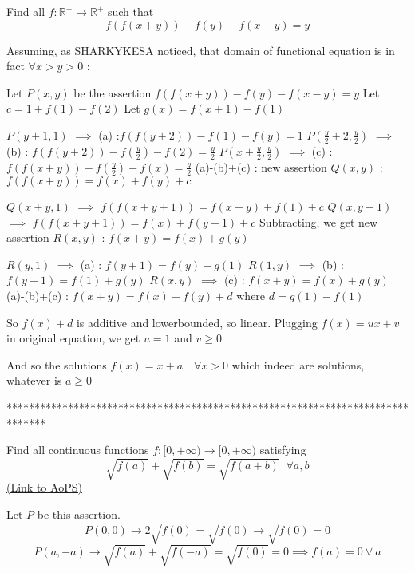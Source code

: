 \begin{solution}
	\begin{tcolorbox}Find all $f: \mathbb{R}^+ \to \mathbb{R}^+$ such that
\[f(f(x+y)) - f(y) - f(x-y) = y\]\end{tcolorbox}
Assuming, as SHARKYKESA noticed, that domain of functional equation is in fact $\forall x>y>0$ :

Let $P(x,y)$ be the assertion $f(f(x+y))-f(y)-f(x-y)=y$
Let $c=1+f(1)-f(2)$
Let $g(x)=f(x+1)-f(1)$

$P(y+1,1)$ $\implies$ (a) :$f(f(y+2))-f(1)-f(y)=1$
$P(\frac y2+2,\frac y2)$ $\implies$ (b) : $f(f(y+2))-f(\frac y2)-f(2)=\frac y2$
$P(x+\frac y2,\frac y2)$ $\implies$ (c) :$f(f(x+y))-f(\frac y2)-f(x)=\frac y2$
(a)-(b)+(c) : new assertion $Q(x,y)$ : $f(f(x+y))=f(x)+f(y)+c$

$Q(x+y,1)$ $\implies$ $f(f(x+y+1))=f(x+y)+f(1)+c$
$Q(x,y+1)$ $\implies$ $f(f(x+y+1))=f(x)+f(y+1)+c$
Subtracting, we get new assertion $R(x,y)$ : $f(x+y)=f(x)+g(y)$

$R(y,1)$ $\implies$ (a) : $f(y+1)=f(y)+g(1)$
$R(1,y)$ $\implies$ (b) : $f(y+1)=f(1)+g(y)$
$R(x,y)$ $\implies$ (c) : $f(x+y)=f(x)+g(y)$
(a)-(b)+(c)  : $f(x+y)=f(x)+f(y)+d$ where $d=g(1)-f(1)$

So $f(x)+d$ is additive and lowerbounded, so linear.
Plugging $f(x)=ux+v$ in original equation, we get $u=1$ and $v\ge 0$

And so the solutions $\boxed{f(x)=x+a\quad\forall x>0}$ which indeed are solutions, whatever is $a\ge 0$




\end{solution}
*******************************************************************************
-------------------------------------------------------------------------------

\begin{problem}
	Find all continuous functions $f:[0, +\infty) \to [0, +\infty)$ satisfying 
$$\sqrt{f(a)}+\sqrt{f(b)}=\sqrt{f(a+b)}\;\; \forall a,b$$
	\flushright \href{https://artofproblemsolving.com/community/c6h1591050}{(Link to AoPS)}
\end{problem}



\begin{solution}
	Let $P$ be this assertion.
$$P(0,0)\to 2\sqrt{f(0)}=\sqrt{f(0)}\to \sqrt{f(0)}=0$$
$$P(a,-a)\to \sqrt{f(a)}+\sqrt{f(-a)}=\sqrt{f(0)}=0\implies f(a)=0\ \forall\ a$$
\end{solution}



